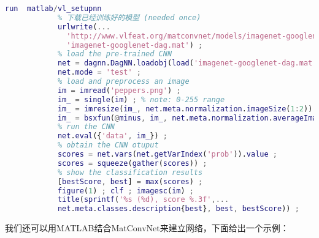\begin{lstlisting}[language = Matlab]
            run  matlab/vl_setupnn
            % 下载已经训练好的模型 (needed once)
            urlwrite(...
              'http://www.vlfeat.org/matconvnet/models/imagenet-googlenet-dag.mat', ...
              'imagenet-googlenet-dag.mat') ;
            % load the pre-trained CNN
            net = dagnn.DagNN.loadobj(load('imagenet-googlenet-dag.mat')) ;
            net.mode = 'test' ;
            % load and preprocess an image
            im = imread('peppers.png') ;
            im_ = single(im) ; % note: 0-255 range
            im_ = imresize(im_, net.meta.normalization.imageSize(1:2)) ;
            im_ = bsxfun(@minus, im_, net.meta.normalization.averageImage) ;
            % run the CNN
            net.eval({'data', im_}) ;
            % obtain the CNN otuput
            scores = net.vars(net.getVarIndex('prob')).value ;
            scores = squeeze(gather(scores)) ;
            % show the classification results
            [bestScore, best] = max(scores) ;
            figure(1) ; clf ; imagesc(im) ;
            title(sprintf('%s (%d), score %.3f',...
            net.meta.classes.description{best}, best, bestScore)) ;
            \end{lstlisting}
            \par
            我们还可以用MATLAB结合MatConvNet来建立网络，下面给出一个示例：
